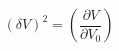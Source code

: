 \begin{equation}
\label{eq:deltaV}
\left(\delta V\right)^2 = \left( \frac{\partial{V}}{\partial{V_0}}\right)
\end{equation}